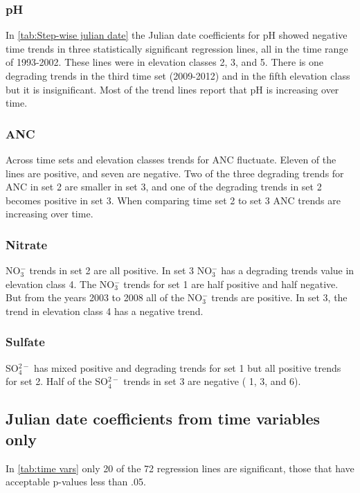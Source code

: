 \subsubsection{pH}

In \autoref{tab:Step-wise julian date} the Julian date coefficients for pH showed negative time trends in three statistically significant regression lines, all in the time range of 1993-2002.  These lines were in elevation classes 2, 3, and 5.  There is one degrading trends in the third time set (2009-2012) and in the fifth elevation class but it is insignificant.   Most of the trend lines report that pH is increasing over time.

\subsubsection{ANC}

Across time sets and elevation classes trends for ANC fluctuate.  Eleven of the lines are positive, and seven are negative.   Two of the three degrading trends for ANC in set 2 are smaller in set 3, and one of the degrading trends in set 2 becomes positive in set 3.  When comparing time set 2 to set 3 ANC trends are increasing over time. 

\subsubsection{Nitrate}

NO$_3^-$ trends in set 2 are all positive. In set 3 NO$_3^-$ has a degrading trends value in elevation class 4. The NO$_3^-$ trends for set 1 are half positive and half negative. But from the years 2003 to 2008 all of the NO$_3^-$ trends are positive. In set 3, the trend in elevation class 4 has a negative trend.

\subsubsection{Sulfate}

SO$_4^{2-}$ has mixed positive and degrading trends for set 1 but all positive trends for set 2. Half of the SO$_4^{2-}$ trends in set 3 are negative ( 1, 3, and 6).

\subsection{Julian date coefficients from time variables only}

In \autoref{tab:time vars} only 20 of the 72 regression lines are significant, those that have acceptable p-values less than .05.

